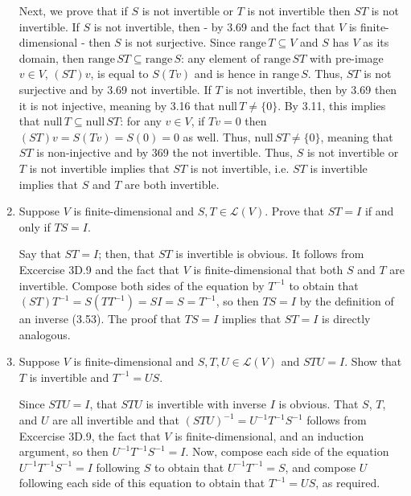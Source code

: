 \documentclass{book}
\begin{document}
\begin{enumerate}
Next, we prove that if \(S\) is not invertible or \(T\) is not invertible then \(ST\) is not invertible.  If \(S\) is not invertible, then - by 3.69 and the fact that \(V\) is finite-dimensional - then \(S\) is not surjective.  Since \(\textrm{range} \, T \subseteq V\) and \(S\) has \(V\) as its domain, then \(\textrm{range} \, ST \subseteq \textrm{range} \, S\): any element of \(\textrm{range} \, ST\) with pre-image \(v \in V\), \((ST)v\), is equal to \(S(Tv)\) and is hence in \(\textrm{range} \, S\).  Thus, \(ST\) is not surjective and by 3.69 not invertible.  If \(T\) is not invertible, then by 3.69 then it is not injective, meaning by 3.16 that \(\textrm{null} \, T \neq \{0\}\).  By 3.11, this implies that \(\textrm{null} \, T \subseteq \textrm{null} \, ST\): for any \(v \in V\), if \(Tv=0\) then \((ST)v=S(Tv)=S(0)=0\) as well. Thus, \(\textrm{null} \, ST \neq \{0\}\), meaning that \(ST\) is non-injective and by 369 the not invertible.  Thus, \(S\) is not invertible or \(T\) is not invertible implies that \(ST\) is not invertible, i.e. \(ST\) is invertible implies that \(S\) and \(T\) are both invertible.

\item Suppose \(V\) is finite-dimensional and \(S,T \in \mathcal{L}(V)\).  Prove that \(ST=I\) if and only if \(TS=I\).

Say that \(ST=I\); then, that \(ST\) is invertible is obvious.  It follows from Excercise 3D.9 and the fact that \(V\) is finite-dimensional that both \(S\) and \(T\) are invertible.  Compose both sides of the equation by \(T^{-1}\) to obtain that \((ST)T^{-1}=S(TT^{-1})=SI=S=T^{-1}\), so then \(TS=I\) by the definition of an inverse (3.53).  The proof that \(TS=I\) implies that \(ST=I\) is directly analogous.

\item Suppose \(V\) is finite-dimensional and \(S,T,U \in \mathcal{L}(V)\) and \(STU=I\).  Show that \(T\) is invertible and \(T^{-1}=US\).

Since \(STU=I\), that \(STU\) is invertible with inverse \(I\) is obvious.  That \(S\), \(T\), and \(U\) are all invertible and that \((STU)^{-1}=U^{-1}T^{-1}S^{-1}\) follows from Excercise 3D.9, the fact that \(V\) is finite-dimensional, and an induction argument, so then \(U^{-1}T^{-1}S^{-1}=I\).  Now, compose each side of the equation \(U^{-1}T^{-1}S^{-1}=I\) following \(S\) to obtain that \(U^{-1}T^{-1}=S\), and compose \(U\) following each side of this equation to obtain that \(T^{-1}=US\), as required.


\end{enumerate}
\end{document}

